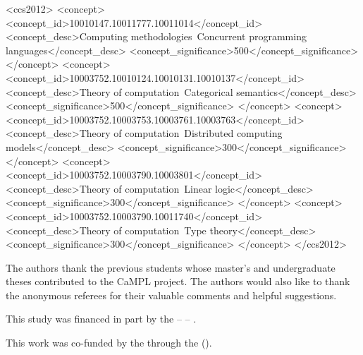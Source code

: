 \documentclass[acmsmall]{acmart}
\begin{document}
\begin{CCSXML}
<ccs2012>
<concept>
<concept_id>10010147.10011777.10011014</concept_id>
<concept_desc>Computing methodologies~Concurrent programming languages</concept_desc>
<concept_significance>500</concept_significance>
</concept>
<concept>
<concept_id>10003752.10010124.10010131.10010137</concept_id>
<concept_desc>Theory of computation~Categorical semantics</concept_desc>
<concept_significance>500</concept_significance>
</concept>
<concept>
<concept_id>10003752.10003753.10003761.10003763</concept_id>
<concept_desc>Theory of computation~Distributed computing models</concept_desc>
<concept_significance>300</concept_significance>
</concept>
<concept>
<concept_id>10003752.10003790.10003801</concept_id>
<concept_desc>Theory of computation~Linear logic</concept_desc>
<concept_significance>300</concept_significance>
</concept>
<concept>
<concept_id>10003752.10003790.10011740</concept_id>
<concept_desc>Theory of computation~Type theory</concept_desc>
<concept_significance>300</concept_significance>
</concept>
</ccs2012>
\end{CCSXML}


\received{\today}

\maketitle

\begin{acks}
The authors thank the previous students whose master's and undergraduate theses contributed to the CaMPL project.
The authors would also like to thank the anonymous referees for their valuable comments and helpful suggestions.

This study was financed in part by the  --  -- .

This work was co-funded by the   through the  ().
\end{acks}
\end{document}
